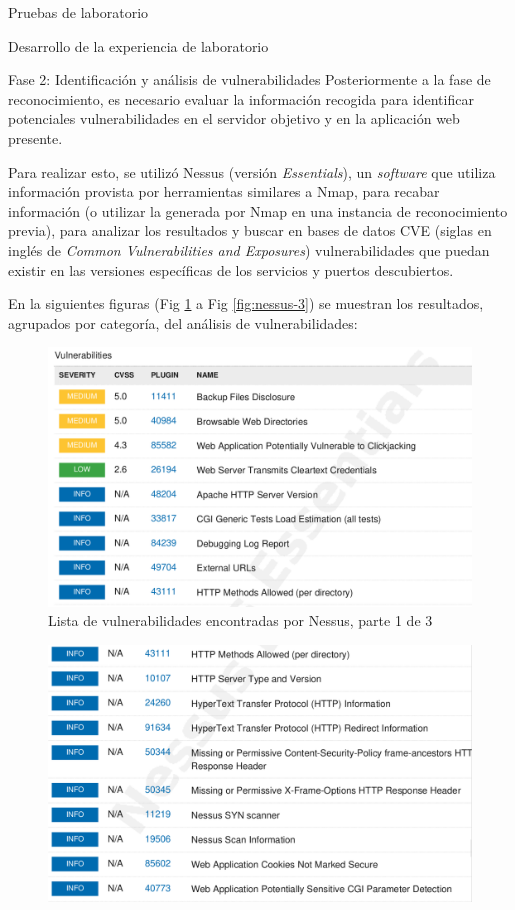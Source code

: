 \begin{section}{Pruebas de laboratorio}
\begin{subsection}{Desarrollo de la experiencia de laboratorio}
\begin{subsubsection} {Fase 2: Identificación y análisis de vulnerabilidades}
    Posteriormente a la fase de reconocimiento, es necesario evaluar la información recogida para identificar potenciales vulnerabilidades en el servidor objetivo y en la aplicación web presente. \par
    Para realizar esto, se utilizó Nessus (versión \textit{Essentials})\cite{nessus}, un \textit{software} que utiliza información provista por herramientas similares a Nmap, para recabar información (o utilizar la generada por Nmap en una instancia de reconocimiento previa), para analizar los resultados y buscar en bases de datos CVE (siglas en inglés de \textit{Common Vulnerabilities and Exposures}) vulnerabilidades que puedan existir en las versiones específicas de los servicios y puertos descubiertos.\par
    En la siguientes figuras (Fig \ref{fig:nessus-1} a Fig \ref{fig:nessus-3}) se muestran los resultados, agrupados por categoría, del análisis de vulnerabilidades:
    \begin{figure}[H]
    \centering
    \includegraphics[width=1\textwidth]{./iteracion_3_imagenes/nessus-1.png}
    \caption{Lista de vulnerabilidades encontradas por Nessus, parte 1 de 3}
    \label{fig:nessus-1}
    \end{figure}
    \FloatBarrier 
     \begin{figure}[H]
    \centering
    \includegraphics[width=1\textwidth]{./iteracion_3_imagenes/nessus-2.png}

\end{figure}
\end{subsubsection}
\end{subsection}
\end{section}
